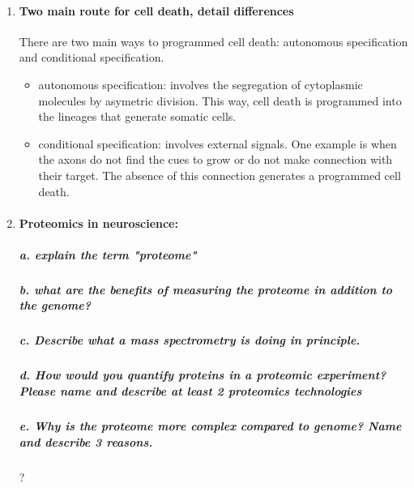 \documentclass[12pt,article,oneside,a4paper]{memoir}
\begin{document}
\begin{enumerate}
\item \paragraph{Two main route for cell death, detail differences}
There are two main ways to programmed cell death: autonomous specification and conditional specification.
\begin{itemize}
\item autonomous specification: involves the segregation of cytoplasmic molecules by asymetric division. This way, cell death is programmed into the lineages that generate somatic cells.
\item conditional specification: involves external signals. One example is when the axons do not find the cues to grow or do not make connection with their target. The absence of this connection generates a programmed cell death.
\end{itemize}

\item \paragraph{Proteomics in neuroscience:}
\subparagraph{a. explain the term "proteome"}
\subparagraph{b. what are the benefits of measuring the proteome in addition to the genome?}
\subparagraph{c. Describe what a mass spectrometry is doing in principle.}
\subparagraph{d. How would you quantify proteins in a proteomic experiment? Please name and describe at least 2 proteomics technologies}
\subparagraph{e. Why is the proteome more complex compared to genome? Name and describe 3 reasons.}?
\end{enumerate}


\end{document}
